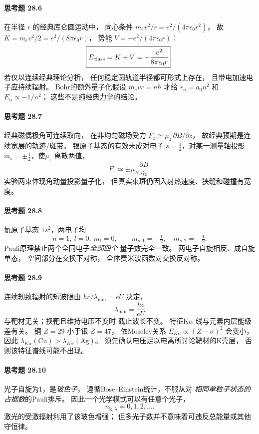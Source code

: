 \paragraph{思考题 28.6}
在半径 \(r\) 的经典库仑圆运动中，
向心条件
\(m_ev^2/r=e^2/(4\pi\epsilon_0r^2)\)，
故
\(K=m_ev^2/2=e^2/(8\pi\epsilon_0r)\)，
势能 \(V=-e^2/(4\pi\epsilon_0r)\)：
\[
\boxed{E_{\rm class}=K+V
=-\frac{e^2}{8\pi\epsilon_0r}}.
\]
若仅以连续经典理论分析，
任何稳定圆轨道半径都可形式上存在，
且带电加速电子应持续辐射。
Bohr的额外量子化假设
\(m_evr=n\hbar\) 才给
\(r_n=a_0n^2\) 和 \(E_n\propto-1/n^2\)；
这些不是纯经典力学的结论。

\paragraph{思考题 28.7}
经典磁偶极角可连续取向，
在非均匀磁场受力
\(F_z\simeq\mu_z\,\partial B/\partial z\)，
故经典预期是连续宽展的轨迹/斑带。
银原子基态的有效未成对电子
\(s=\frac12\)，对某一测量轴投影
\(m_s=\pm\frac12\)，使\(\mu_z\) 离散两值，
\[
\boxed{F_z\simeq\pm\mu_B\frac{\partial B}{\partial z}}.
\]
实验两束体现角动量投影量子化，
但真实束斑仍因入射热速度、狭缝和碰撞有宽度。

\paragraph{思考题 28.8}
氦原子基态 \(1s^2\)，两电子均
\[
\boxed{n=1,\ l=0,\ m_l=0},
\qquad
\boxed{m_{s,1}=+\tfrac12,\quad
m_{s,2}=-\tfrac12}.
\]
Pauli原理禁止两个全同电子\emph{全部四个}
量子数完全一致。
两电子自旋相反、成自旋单态，
空间部分在交换下对称，
全体费米波函数对交换反对称。

\paragraph{思考题 28.9}
连续轫致辐射的短波限由
\(hc/\lambda_{\min}=eU\) 决定，
\[
\boxed{\lambda_{\min}=\frac{hc}{eU}}
\]
与靶材无关；换靶且维持电压不变时
截止波长不变。
特征K\(\alpha\) 线与元素内层能级差有关。
铜 \(Z=29\) 小于银 \(Z=47\)，
依Moseley关系
\(E_{K\alpha}\propto(Z-\sigma)^2\)
会变小，因此
\(\boxed{\lambda_{K\alpha}(\mathrm{Cu})
>\lambda_{K\alpha}(\mathrm{Ag})}\)。
须先确认电压足以电离所讨论靶材的K壳层，
否则该特征谱线可能不出现。

\paragraph{思考题 28.10}
光子自旋为1，是\emph{玻色子}，
遵循Bose--Einstein统计，不服从对
\emph{相同单粒子状态的占据数}的Pauli排斥。
因此一个光学模式可以有任意个光子，
\[
\boxed{n_{\boldsymbol k,\lambda}=0,1,2,\ldots}.
\]
激光的受激辐射利用了该玻色增强；
但多光子数并不意味着可违反总能量或其他守恒律。

